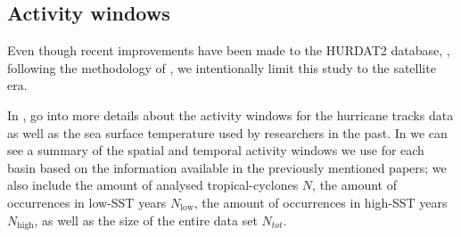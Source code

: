 \subsection{Activity windows}\label{ssec:act-windows}
Even though recent improvements have been made to the HURDAT2 database, \cite{o:hurdat-comparison,Landsea2014,Landsea2016}, following the methodology of \citeauthor{Corral2010}, we intentionally limit this study to the satellite era.

In \cite{Webster2005}, \citeauthor{Webster2005} go into more details about the activity windows for the hurricane tracks data as well as the sea surface temperature used by researchers in the past. In  we can see a summary of the spatial and temporal activity windows we use for each basin based on the information available in the previously mentioned papers; we also include the amount of analysed tropical-cyclones $N$, the amount of occurrences in low-SST years $N_{\text{low}}$, the amount of occurrences in high-SST years $N_{\text{high}}$, as well as the size of the entire data set $N_{tot}$.
\begin{table}[H]
	\centering
	\caption{Spatial and temporal activity windows for each basin}
	\label{tab:act-windows}
\end{table}

